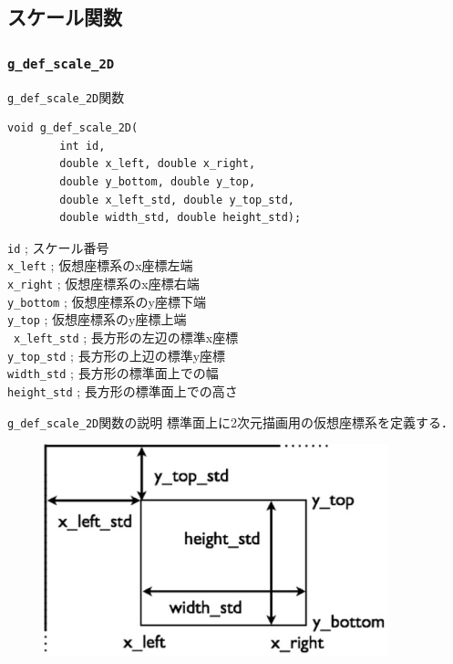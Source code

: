 \documentclass[platex,a4paper,12pt]{jsarticle}%
\begin{document}
\clearpage
\subsection{スケール関数}

\subsubsection{\texttt{g\_def\_scale\_2D}}

\begin{itembox}[l]{\texttt{g\_def\_scale\_2D}関数}
\begin{verbatim}
void g_def_scale_2D(
        int id,
        double x_left, double x_right,
        double y_bottom, double y_top,
        double x_left_std, double y_top_std,
        double width_std, double height_std);
\end{verbatim}
\verb|id| ; スケール番号\\
\verb|x_left| ; 仮想座標系のx座標左端\\
\verb|x_right| ; 仮想座標系のx座標右端\\
\verb|y_bottom| ; 仮想座標系のy座標下端\\
\verb|y_top| ; 仮想座標系のy座標上端\\\
\verb|x_left_std| ; 長方形の左辺の標準x座標\\
\verb|y_top_std| ; 長方形の上辺の標準y座標\\
\verb|width_std| ; 長方形の標準面上での幅\\
\verb|height_std| ; 長方形の標準面上での高さ
\end{itembox}

\begin{itembox}[l]{\texttt{g\_def\_scale\_2D}関数の説明}
標準面上に2次元描画用の仮想座標系を定義する．
\end{itembox}

\begin{figure}[htb]
	\includegraphics[width=100mm]{./Figures/eps/Canvas_g_def_scale_2D.eps}
\end{figure}
\end{document}
